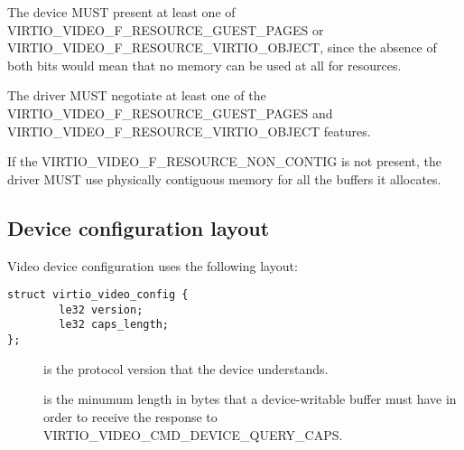 
The device MUST present at least one of
VIRTIO\_VIDEO\_F\_RESOURCE\_GUEST\_PAGES or
VIRTIO\_VIDEO\_F\_RESOURCE\_VIRTIO\_OBJECT, since the absence of both
bits would mean that no memory can be used at all for resources.


The driver MUST negotiate at least one of the
VIRTIO\_VIDEO\_F\_RESOURCE\_GUEST\_PAGES and
VIRTIO\_VIDEO\_F\_RESOURCE\_VIRTIO\_OBJECT features.

If the VIRTIO\_VIDEO\_F\_RESOURCE\_NON\_CONTIG is not present, the
driver MUST use physically contiguous memory for all the buffers it
allocates.

\subsection{Device configuration layout}\label{sec:Device Types / Video Device / Device configuration layout}

Video device configuration uses the following layout:

\begin{lstlisting}
struct virtio_video_config {
        le32 version;
        le32 caps_length;
};
\end{lstlisting}

\begin{description}
\item[]
is the protocol version that the device understands.
\item[]
is the minumum length in bytes that a device-writable buffer must have
in order to receive the response to
VIRTIO\_VIDEO\_CMD\_DEVICE\_QUERY\_CAPS.
\end{description}


